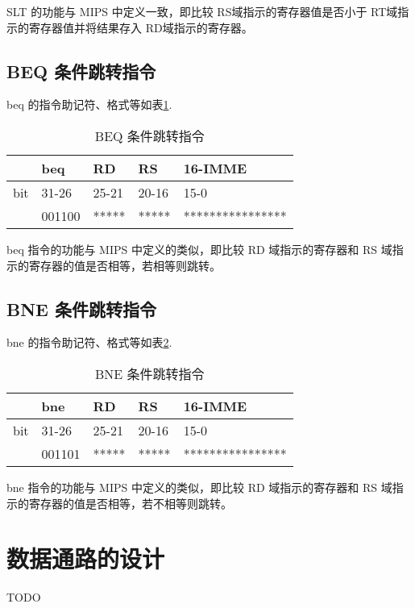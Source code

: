 \documentclass[a4paper,dvipdfm]{ctexart}
\begin{document}
SLT 的功能与 MIPS 中定义一致，即比较 RS域指示的寄存器值是否小于 RT域指
示的寄存器值并将结果存入 RD域指示的寄存器。

\subsection{BEQ 条件跳转指令}
\label{sec:beq-}

beq 的指令助记符、格式等如表\ref{tab:beq}.

\begin{table}[hbt!]
  \centering
  \begin{tabular}{|l|l|l|l|l|}
    \hline
    &beq&RD&RS&16-IMME\\
    \hline
    bit&31-26&25-21&20-16&15-0\\
    \hline
    &001100&*****&*****&****************\\
    \hline
  \end{tabular}
  \caption{BEQ 条件跳转指令}
  \label{tab:beq}
\end{table}

beq 指令的功能与 MIPS 中定义的类似，即比较 RD 域指示的寄存器和 RS 域指
示的寄存器的值是否相等，若相等则跳转。

\subsection{BNE 条件跳转指令}
\label{sec:bne-}

bne 的指令助记符、格式等如表\ref{tab:bne}.

\begin{table}[hbt!]
  \centering
  \begin{tabular}{|l|l|l|l|l|}
    \hline
    &bne&RD&RS&16-IMME\\
    \hline
    bit&31-26&25-21&20-16&15-0\\
    \hline
    &001101&*****&*****&****************\\
    \hline
  \end{tabular}
  \caption{BNE 条件跳转指令}
  \label{tab:bne}
\end{table}

bne 指令的功能与 MIPS 中定义的类似，即比较 RD 域指示的寄存器和 RS 域指
示的寄存器的值是否相等，若不相等则跳转。

\section{数据通路的设计}
\label{sec:datapath}

TODO
\end{document}

